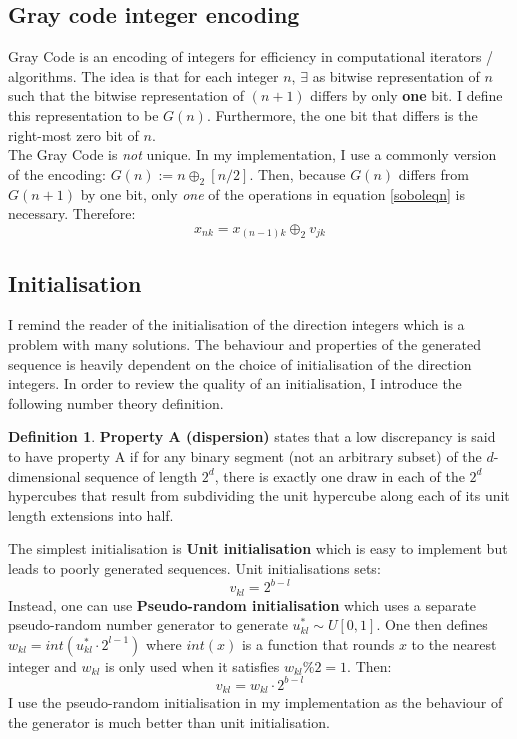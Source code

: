 \documentclass{report}
\theoremstyle{plain}
\theoremstyle{definition}
\newtheorem{defn}[thm]{Definition} %
\begin{document}
\subsection{Gray code integer encoding}

Gray Code is an encoding of integers for efficiency in computational iterators / algorithms. The idea is that for each integer $n$, $\exists$ as bitwise representation of $n$ such that the bitwise representation of $(n+1)$ differs by only \textbf{one} bit. I define this representation to be $G(n)$. Furthermore, the one bit that differs is the right-most zero bit of $n$. \\

The Gray Code is \emph{not} unique. In my implementation, I use a commonly version of the encoding: $G(n) := n \oplus_2 [n/2]$. Then, because $G(n)$ differs from $G(n+1)$ by one bit, only \emph{one} of the operations in equation \ref{soboleqn} is necessary. Therefore: $$ x_{nk} = x_{(n-1)k} \oplus_2 v_{jk}$$

\subsection{Initialisation}

I remind the reader of the initialisation of the direction integers which is a problem with many solutions. The behaviour and properties of the generated sequence is heavily dependent on the choice of initialisation of the direction integers. In order to review the quality of an initialisation, I introduce the following number theory definition.

\begin{defn}
	\textbf{Property A (dispersion)} states that a low discrepancy is said to have property A if for any binary segment (not an arbitrary subset) of the $d$-dimensional sequence of length $2^d$, there is exactly one draw in each of the $2^d$ hypercubes that result from subdividing the unit hypercube along each of its unit length extensions into half.
\end{defn}

The simplest initialisation is \textbf{Unit initialisation} which is easy to implement but leads to poorly generated sequences. Unit initialisations sets: $$v_{kl} = 2^{b-l}$$
Instead, one can use \textbf{Pseudo-random initialisation} which uses a separate pseudo-random number generator to generate $u_{kl}^* \sim U[0,1]$. One then defines $w_{kl} = int(u_{kl}^* \cdot 2^{l-1})$ where $int(x)$ is a function that rounds $x$ to the nearest integer and $w_{kl}$ is only used when it satisfies $w_{kl} \% 2 = 1$. Then: $$v_{kl} = w_{kl} \cdot 2^{b-l}$$
I use the pseudo-random initialisation in my implementation as the behaviour of the generator is much better than unit initialisation.
\end{document}
